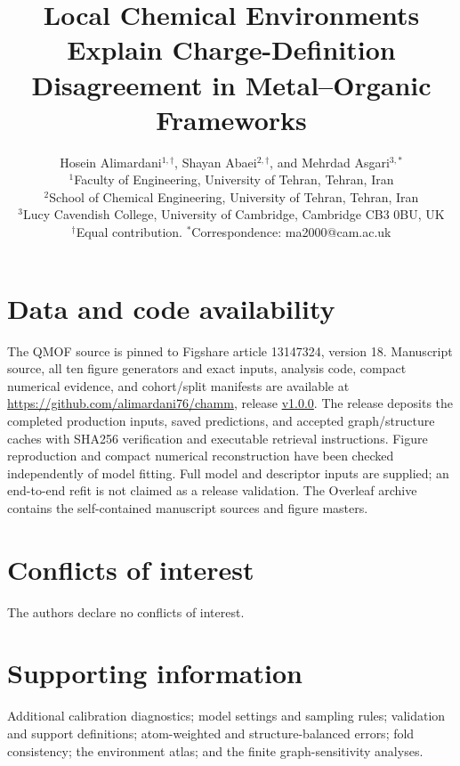 \documentclass[11pt]{article}
\title{Local Chemical Environments Explain Charge-Definition Disagreement in Metal--Organic Frameworks}
\author{Hosein Alimardani$^{1,\dagger}$, Shayan Abaei$^{2,\dagger}$, and Mehrdad Asgari$^{3,*}$\\[5pt]
\small $^1$Faculty of Engineering, University of Tehran, Tehran, Iran\\
\small $^2$School of Chemical Engineering, University of Tehran, Tehran, Iran\\
\small $^3$Lucy Cavendish College, University of Cambridge, Cambridge CB3 0BU, UK\\
\small $^\dagger$Equal contribution. $^*$Correspondence: ma2000@cam.ac.uk}
\date{}
\begin{document}
\maketitle





\section*{Data and code availability}
The QMOF source is pinned to Figshare article 13147324, version 18.\cite{QMOFv18} Manuscript source, all ten figure generators and exact inputs, analysis code, compact numerical evidence, and cohort/split manifests are available at \url{https://github.com/alimardani76/chamm}, release \href{https://github.com/alimardani76/chamm/releases/tag/v1.0.0}{v1.0.0}. The release deposits the completed production inputs, saved predictions, and accepted graph/structure caches with SHA256 verification and executable retrieval instructions. Figure reproduction and compact numerical reconstruction have been checked independently of model fitting. Full model and descriptor inputs are supplied; an end-to-end refit is not claimed as a release validation. The Overleaf archive contains the self-contained manuscript sources and figure masters.
\section*{Conflicts of interest}
The authors declare no conflicts of interest.
\section*{Supporting information}
Additional calibration diagnostics; model settings and sampling rules; validation and support definitions; atom-weighted and structure-balanced errors; fold consistency; the environment atlas; and the finite graph-sensitivity analyses.


\end{document}
